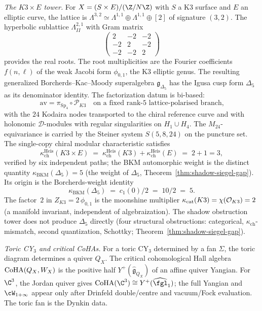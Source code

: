 \emph{The $K3 \times E$ tower.} For $X = (S \times E)/(\Z/N\Z)$
with $S$ a K3 surface and $E$ an elliptic curve, the lattice
is
$\Lambda^{3,2} \simeq \Lambda^{1,1} \oplus \Lambda^{1,1}
\oplus [2]$ of signature $(3, 2)$. The hyperbolic sublattice
$\Lambda^{2,1}_{II}$ with Gram matrix
\[
 \begin{pmatrix}
 2 & -2 & -2 \\
 -2 & 2 & -2 \\
 -2 & -2 & 2
 \end{pmatrix}
\]
provides the real roots. The root multiplicities are the
Fourier coefficients $f(n, \ell)$ of the weak Jacobi form
$\phi_{0,1}$, the K3 elliptic genus. The resulting generalized
Borcherds--Kac--Moody superalgebra
$\mathfrak{g}_{\Delta_5}$ has the Igusa cusp form $\Delta_5$ as
its denominator identity. The factorization datum is bi-based:
\[
 \mathrm{av}
 =
 \pi_{\mathrm{Sp}_4}\circ\mathscr P_{K3}
 \quad\text{on a fixed rank-\(5\) lattice-polarised branch,}
\]
with the \(24\) Kodaira nodes transported to the chiral reference curve and with holonomic
$\mathcal{D}$-modules with regular singularities on
$H_1\cup H_4$. The $M_{24}$-equivariance is carried by the
Steiner system $S(5,8,24)$ on the puncture set. The single-copy chiral modular
characteristic satisfies
\[
 \kappa_{\mathrm{ch}}^{\mathrm{Heis}}(K3 \times E)
 \;=\; \kappa_{\mathrm{ch}}^{\mathrm{Heis}}(K3)
 + \kappa_{\mathrm{ch}}^{\mathrm{Heis}}(E)
 \;=\; 2+1=3,
\]
verified by six independent paths; the BKM automorphic weight
is the distinct quantity $\kappa_{\mathrm{BKM}}(\Delta_5) = 5$ (the
weight of $\Delta_5$, Theorem~\ref{thm:shadow-siegel-gap}).
Its origin is the Borcherds-weight identity
\[
 \kappa_{\mathrm{BKM}}(\Delta_5)
 \;=\;
 c_1(0)/2
 \;=\;
 10/2
 \;=\;
 5.
\]
The factor~$2$ in $Z_{K3} = 2\,\phi_{0,1}$ is the moonshine
multiplier
$\kappa_{\mathrm{cat}}(K3) = \chi(\mathcal{O}_{K3}) = 2$ (a manifold
invariant, independent of algebraization). The shadow
obstruction tower does not produce $\Delta_5$ directly (four
structural obstructions: categorical,
$\kappa_{\mathrm{ch}}$-mismatch, second quantization, Schottky;
Theorem~\ref{thm:shadow-siegel-gap}).

\emph{Toric CY$_3$ and critical CoHAs.} For a toric CY$_3$
determined by a fan $\Sigma$, the toric diagram determines a
quiver $Q_X$. The critical cohomological Hall algebra
$\mathrm{CoHA}(Q_X,W_X)$ is the positive half
$Y^+(\widehat{\mathfrak{g}}_{Q_X})$ of an affine quiver Yangian.
For $\C^3$, the Jordan quiver gives
$\CoHA(\C^3)\cong Y^+(\widehat{\fgl}_1)$; the full Yangian and
$\cW_{1+\infty}$ appear only after Drinfeld double/centre and
vacuum/Fock evaluation. The toric fan is
the Dynkin data.

